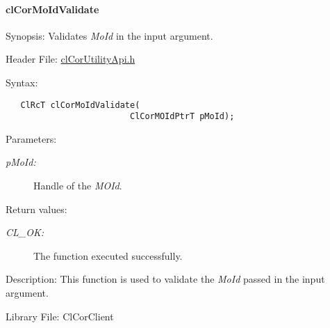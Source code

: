 \hypertarget{pagecor240}{}\paragraph{cl\-Cor\-Mo\-Id\-Validate}\label{pagecor240}
\begin{Desc}
\item[Synopsis:]Validates {\em Mo\-Id\/} in the input argument.\end{Desc}
\begin{Desc}
\item[Header File:]\hyperlink{cl_cor_utility_api_8h}{cl\-Cor\-Utility\-Api.h}\end{Desc}
\begin{Desc}
\item[Syntax:]

\footnotesize\begin{verbatim}   ClRcT clCorMoIdValidate(
                         ClCorMOIdPtrT pMoId);
\end{verbatim}
\normalsize
\end{Desc}
\begin{Desc}
\item[Parameters:]
\begin{description}
\item[{\em p\-Mo\-Id:}]Handle of the {\em MOId\/}.\end{description}
\end{Desc}
\begin{Desc}
\item[Return values:]
\begin{description}
\item[{\em CL\_\-OK:}]The function executed successfully.\end{description}
\end{Desc}
\begin{Desc}
\item[Description:]This function is used to validate the {\em Mo\-Id\/} passed in the input argument.\end{Desc}
\begin{Desc}
\item[Library File:]Cl\-Cor\-Client\end{Desc}
